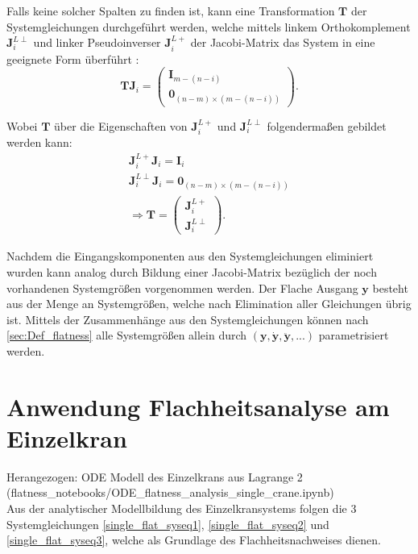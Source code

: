 Falls keine solcher Spalten zu finden ist, kann eine Transformation $\mathbf{T}$ der Systemgleichungen durchgeführt werden, welche mittels linkem Orthokomplement $\mathbf{J}_i^{L \perp}$ und linker Pseudoinverser $\mathbf{J}_i^{L +}$ der Jacobi-Matrix das System in eine geeignete Form überführt \cite[Abschnitt 2.1.2]{Fritzsche2016}:
\begin{equation}
	\mathbf{T} \mathbf{J}_i = 
	\begin{pmatrix}
		\mathbf{I}_{m-(n-i)} \\
		\mathbf{0}_{(n-m) \times (m-(n-i))}
	\end{pmatrix}.
\end{equation}

Wobei $\mathbf{T}$ über die Eigenschaften von $\mathbf{J}_i^{L +}$ und  $\mathbf{J}_i^{L \perp}$ folgendermaßen gebildet werden kann:
\begin{align}
	\mathbf{J}_i^{L +} \mathbf{J}_i = \mathbf{I}_i \\
	\mathbf{J}_i^{L \perp} \mathbf{J}_i = \mathbf{0}_{(n-m) \times (m-(n-i))} \\
	\Rightarrow \mathbf{T} = 
	\begin{pmatrix}
		\mathbf{J}_i^{L +} \\
		\mathbf{J}_i^{L \perp}
	\end{pmatrix} .
\end{align}

Nachdem die Eingangskomponenten aus den Systemgleichungen eliminiert wurden kann analog durch Bildung einer Jacobi-Matrix bezüglich der noch vorhandenen Systemgrößen vorgenommen werden. Der Flache Ausgang $\mathbf{y}$ besteht aus der Menge an Systemgrößen, welche nach Elimination aller Gleichungen übrig ist. Mittels der Zusammenhänge aus den Systemgleichungen können nach \ref{sec:Def_flatness} alle Systemgrößen allein durch $(\mathbf{y}, \dot{\mathbf{y}}, \ddot{\mathbf{y}}, ...)$ parametrisiert werden.

\section{Anwendung Flachheitsanalyse am Einzelkran}
Herangezogen: ODE Modell des Einzelkrans aus Lagrange 2 \\ (flatness\_notebooks/ODE\_flatness\_analysis\_single\_crane.ipynb) \\
Aus der analytischer Modellbildung des Einzelkransystems folgen die 3 Systemgleichungen \ref{single_flat_syseq1}, \ref{single_flat_syseq2} und \ref{single_flat_syseq3}, welche als Grundlage des Flachheitsnachweises dienen. 

